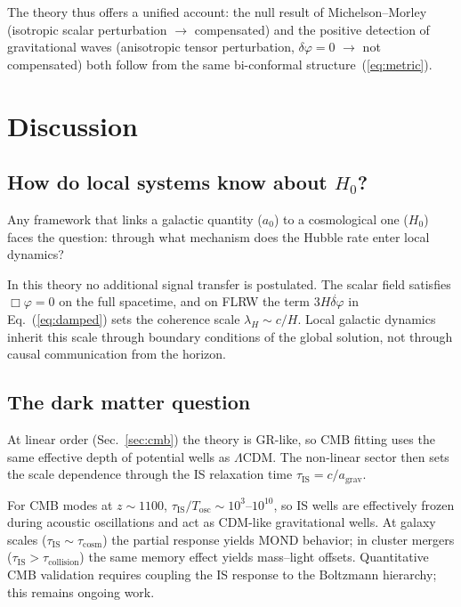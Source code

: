 \documentclass[aps,prd,onecolumn,superscriptaddress,nofootinbib,showpacs,12pt]{revtex4-2}
\newcommand{\azero}{a_{0}}
\begin{document}
The theory thus offers a unified account: the null result
of Michelson--Morley (isotropic scalar perturbation
$\to$ compensated) and the positive detection of
gravitational waves (anisotropic tensor perturbation,
$\delta\varphi = 0$ $\to$ not compensated) both follow
from the same bi-conformal
structure~(\ref{eq:metric}).

\section{Discussion}\label{sec:discussion}

\subsection{How do local systems know about $H_{0}$?}
\label{sec:nonlocality}

Any framework that links a galactic quantity ($\azero$) to
a cosmological one ($H_{0}$) faces the question: through
what mechanism does the Hubble rate enter local dynamics?

In this theory no additional signal transfer is postulated.
The scalar field satisfies $\Box\varphi = 0$ on the full
spacetime, and on FLRW the term $3H\dot{\delta\varphi}$
in Eq.~(\ref{eq:damped}) sets the coherence scale
$\lambda_H \sim c/H$.  Local galactic dynamics inherit this
scale through boundary conditions of the global solution,
not through causal communication from the horizon.

\subsection{The dark matter question}\label{sec:dm}

At linear order (Sec.~\ref{sec:cmb}) the theory is GR-like,
so CMB fitting uses the same effective depth of potential
wells as $\Lambda$CDM.  The non-linear sector then sets the
scale dependence through the IS relaxation time
$\tau_{\mathrm{IS}} = c/a_{\mathrm{grav}}$.

For CMB modes at $z\sim1100$,
$\tau_{\mathrm{IS}}/T_{\mathrm{osc}} \sim 10^{3}$--$10^{10}$,
so IS wells are effectively frozen during acoustic
oscillations and act as CDM-like gravitational wells.  At
galaxy scales ($\tau_{\mathrm{IS}} \sim \tau_{\mathrm{cosm}}$)
the partial response yields MOND behavior; in cluster
mergers ($\tau_{\mathrm{IS}} > \tau_{\mathrm{collision}}$)
the same memory effect yields mass--light offsets.
Quantitative CMB validation requires coupling the IS response
to the Boltzmann hierarchy; this remains ongoing work.
\end{document}
